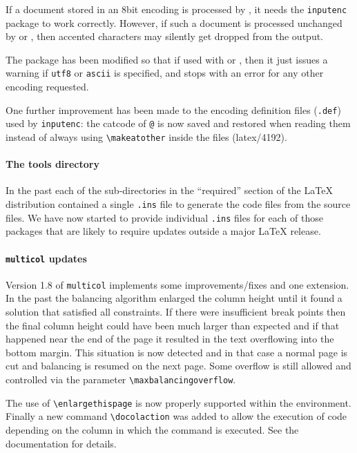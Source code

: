 \documentclass{ltnews}
\providecommand\pkg[1]{\texttt{#1}}
\providecommand\option[1]{\texttt{#1}}
\begin{document}
If a document stored in an 8bit encoding is processed by
, it needs the \pkg{inputenc} package to work
correctly. However, if such a document is processed unchanged by
 or , then accented characters may
silently get dropped from the output.

The package has been modified so that if used with  or
, then it just issues a warning if \option{utf8} or
\option{ascii} is specified, and stops with an error for any other
encoding requested.



One further improvement has been made to the encoding definition files
(\texttt{.def}) used by \pkg{inputenc}: the catcode of \texttt{@}
is now saved and restored when reading them instead of always using
\verb=\makeatother= inside the files (latex/4192).



\paragraph{The tools directory}

In the past each of the sub-directories in the ``required'' section of
the \LaTeX{} distribution contained a single \texttt{.ins} file to
generate the code files from the source files. We have now
started to provide individual \texttt{.ins} files for each of those
packages that are likely to require updates outside a major
\LaTeX{} release.

\paragraph{\pkg{multicol} updates}

Version 1.8 of \pkg{multicol} implements some improvements/fixes
and one extension. In the past the balancing algorithm enlarged the
column height until it found a solution that satisfied all
constraints. If there were insufficient break points then the final
column height could have been much larger than expected and if that
happened near the end of the page it resulted in the text overflowing
into the bottom margin. This situation is now detected and in that
case a normal page is cut and balancing is resumed on the next
page. Some overflow is still allowed and controlled via the parameter
\verb=\maxbalancingoverflow=.

The use of \verb=\enlargethispage= is now properly supported within
the environment. Finally a new command \verb=\docolaction= was added
to allow the execution of code depending on the column in which the
command is executed. See the documentation for details.
\end{document}
